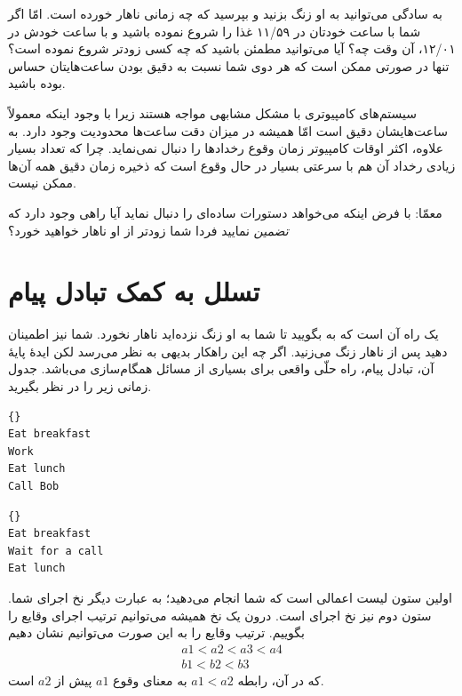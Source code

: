 \documentclass{book}
\newcommand{\clearemptydoublepage}{\newpage\cleardoublepage}
\begin{document}
    به سادگی می‌توانید به او زنگ بزنید و بپرسید که چه زمانی ناهار خورده است. امّا اگر شما با ساعت خودتان در ۱۱/۵۹ غذا را شروع نموده باشید 
    و  با ساعت خودش در ۱۲/۰۱، آن وقت چه؟ آیا می‌توانید مطمئن باشید که چه کسی زودتر شروع نموده است؟ 
    تنها در صورتی ممکن است که هر دوی شما نسبت به دقیق بودن ساعت‌هایتان حساس بوده باشید.

    سیستم‌های کامپیوتری با مشکل مشابهی مواجه هستند زیرا با وجود اینکه معمولاً ساعت‌هایشان دقیق است امّا همیشه 
    در میزان دقت ساعت‌ها محدودیت وجود دارد. به علاوه، اکثر اوقات کامپیوتر زمان وقوع رخدادها را دنبال نمی‌نماید. 
    چرا که تعداد بسیار زیادی رخداد آن هم با سرعتی بسیار در حال وقوع است که ذخیره  زمان دقیق همه آن‌ها ممکن نیست. 
    
    معمّا: با فرض اینکه  می‌خواهد دستورات ساده‌ای را دنبال نماید آیا راهی وجود دارد که \emph{تضمین} نمایید فردا شما زودتر از او ناهار خواهید خورد؟
    
\clearemptydoublepage
\section {تسلل به کمک تبادل پیام}
\label{serialization}

    یک راه آن است که به  بگویید تا شما به او زنگ نزده‌اید ناهار نخورد. شما نیز  اطمینان دهید پس از ناهار زنگ می‌زنید. 
    اگر چه این راهکار بدیهی به نظر می‌رسد لکن ایدهٔ پایهٔ آن، تبادل پیام، راه حلّی واقعی برای بسیاری
    از مسائل همگام‌سازی می‌باشد. جدول زمانی زیر را در نظر بگیرید. 
    
\begin{latin}
\begin{minipage}[t]{2in}
\begin{latin}
\begin{lstlisting}[title=\rl{نخ \lr{A} (شما)}]{}
Eat breakfast 
Work          
Eat lunch     
Call Bob
\end{lstlisting}
\end{latin}
\end{minipage}
\hfill
\begin{minipage}[t]{2in}
\begin{latin}
\begin{lstlisting}[title=\rl{نخ \lr{B} (‌Bob)}]{}
Eat breakfast
Wait for a call
Eat lunch
\end{lstlisting}
\end{latin}
\end{minipage}
\end{latin}
%
    اولین ستون لیست اعمالی است که شما انجام می‌دهید؛ به عبارت دیگر نخ اجرای شما. 
    ستون دوم نیز نخ اجرای  است. درون یک نخ همیشه می‌توانیم ترتیب اجرای وقایع را بگوییم. 
    ترتیب وقایع را به این صورت می‌توانیم نشان دهیم
%
\begin{eqnarray*}
a1 < a2 < a3 < a4  \\
b1 < b2 < b3
\end{eqnarray*}
%
    که در آن، رابطه  $a1 < a2$ به معنای وقوع  $a1$ پیش از  $a2$ است. 
\end{document}
